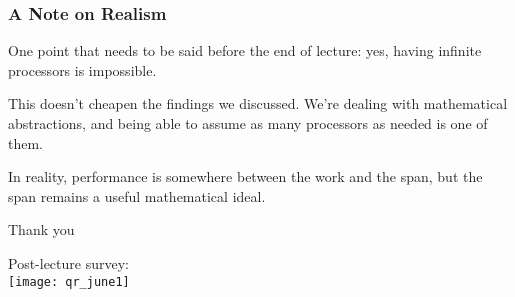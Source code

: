 \documentclass[aspectratio=169, handout]{beamer}
\begin{document}
\begin{frame}[fragile]
  \frametitle{ A Note on Realism }

  One point that needs to be said before the end of lecture: yes, having
  infinite processors is impossible\footnotemark.

  \pause
  \vspace{\fill}

  This doesn't cheapen the findings we discussed. We're dealing with 
  mathematical abstractions, and being able to assume as many processors
  as needed is one of them.

  \pause
  \vspace{\fill}

  In reality, performance is somewhere between the work and the span, but
  the span remains a useful mathematical ideal.

\end{frame}

\begin{frame}[plain]
	\begin{center} Thank you \end{center}

	\begin{center} 
    Post-lecture survey: \\
    \vspace{5pt}
    \texttt{[image: qr\_june1]}
  \end{center}
\end{frame}
\end{document}
